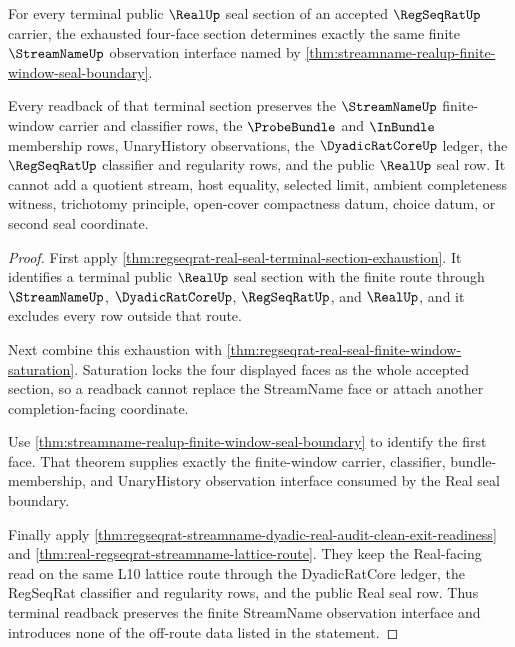 \begin{theorem}
\label{thm:regseqrat-real-seal-terminal-section-observation-lock}
For every terminal public $\RealUp$ seal section of an accepted
$\RegSeqRatUp$ carrier, the exhausted four-face section determines exactly the
same finite $\StreamNameUp$ observation interface named by
\autoref{thm:streamname-realup-finite-window-seal-boundary}.

Every readback of that terminal section preserves the $\StreamNameUp$
finite-window carrier and classifier rows, the $\ProbeBundle$ and $\InBundle$
membership rows, UnaryHistory observations, the $\DyadicRatCoreUp$ ledger, the
$\RegSeqRatUp$ classifier and regularity rows, and the public $\RealUp$ seal
row. It cannot add a quotient stream, host equality, selected limit, ambient
completeness witness, trichotomy principle, open-cover compactness datum,
choice datum, or second seal coordinate.
\end{theorem}
\begin{proof}
First apply
\autoref{thm:regseqrat-real-seal-terminal-section-exhaustion}. It identifies a
terminal public $\RealUp$ seal section with the finite route through
$\StreamNameUp$, $\DyadicRatCoreUp$, $\RegSeqRatUp$, and $\RealUp$, and it
excludes every row outside that route.

Next combine this exhaustion with
\autoref{thm:regseqrat-real-seal-finite-window-saturation}. Saturation locks
the four displayed faces as the whole accepted section, so a readback cannot
replace the StreamName face or attach another completion-facing coordinate.

Use \autoref{thm:streamname-realup-finite-window-seal-boundary} to identify the
first face. That theorem supplies exactly the finite-window carrier,
classifier, bundle-membership, and UnaryHistory observation interface consumed
by the Real seal boundary.

Finally apply
\autoref{thm:regseqrat-streamname-dyadic-real-audit-clean-exit-readiness} and
\autoref{thm:real-regseqrat-streamname-lattice-route}. They keep the
Real-facing read on the same L10 lattice route through the DyadicRatCore ledger,
the RegSeqRat classifier and regularity rows, and the public Real seal row.
Thus terminal readback preserves the finite StreamName observation interface
and introduces none of the off-route data listed in the statement.
\end{proof}

